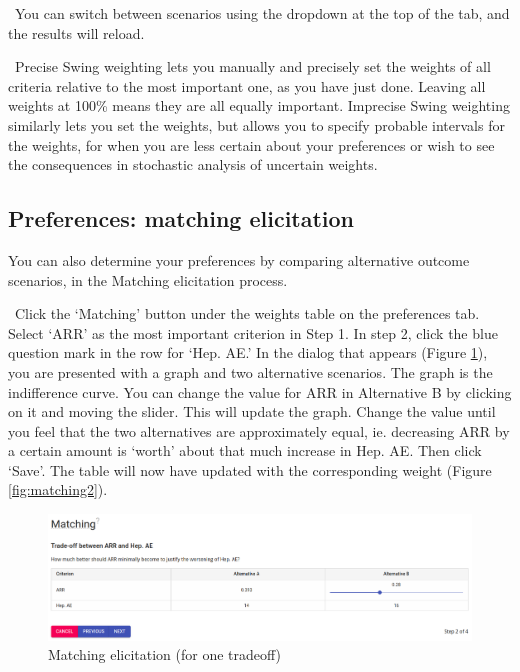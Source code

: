 \documentclass[00_mcda_tutorial.tex]{subfiles}
\begin{document}
\noindent \faLightbulbO \, You can switch between scenarios using the dropdown at the top of the tab, and the results will reload.
\newline

\noindent \faGraduationCap \, Precise Swing weighting lets you manually and precisely set the weights of all criteria relative to the most important one, as you have just done. Leaving all weights at 100\% means they are all equally important. Imprecise Swing weighting similarly lets you set the weights, but allows you to specify probable intervals for the weights, for when you are less certain about your preferences or wish to see the consequences in stochastic analysis of uncertain weights.

\subsection*{Preferences: matching elicitation}
You can also determine your preferences by comparing alternative outcome scenarios, in the Matching elicitation process.
\newline

\noindent \leftpointright \, Click the ‘Matching’ button under the weights table on the preferences tab. Select ‘ARR’ as the most important criterion in Step 1. In step 2, click the blue question mark in the row for ‘Hep. AE.’ In the dialog that appears (Figure \ref{fig:matching1}), you are presented with a graph and two alternative scenarios. The graph is the indifference curve. You can change the value for ARR in Alternative B by clicking on it and moving the slider. This will update the graph. Change the value until you feel that the two alternatives are approximately equal, ie. decreasing ARR by a certain amount is ‘worth’ about that much increase in Hep. AE. Then click ‘Save’. The table will now have updated with the corresponding weight (Figure \ref{fig:matching2}).
\newline

\begin{figure}[!h]
    \centering
	\includegraphics[width=\textwidth]{fig/matching1.png}
    \caption{Matching elicitation (for one tradeoff)}
	\label{fig:matching1}
\end{figure}
\end{document}
